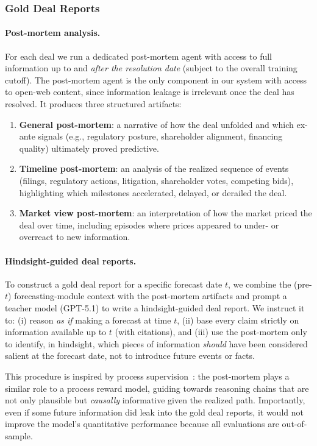 \documentclass{article}
\theoremstyle{plain}
\theoremstyle{definition}
\theoremstyle{remark}
\begin{document}
\subsubsection{Gold Deal Reports}
\label{sec:gold-reasoning}

\paragraph{Post-mortem analysis.}
For each deal we run a dedicated post-mortem agent with access to full information up to and \emph{after the resolution date} (subject to the overall training cutoff). The post-mortem agent is the only component in our system with access to open-web content, since information leakage is irrelevant once the deal has resolved. It produces three structured artifacts:
\begin{enumerate}
    \item \textbf{General post-mortem}: a narrative of how the deal unfolded and which ex-ante signals (e.g., regulatory posture, shareholder alignment, financing quality) ultimately proved predictive.
    \item \textbf{Timeline post-mortem}: an analysis of the realized sequence of events (filings, regulatory actions, litigation, shareholder votes, competing bids), highlighting which milestones accelerated, delayed, or derailed the deal.
    \item \textbf{Market view post-mortem}: an interpretation of how the market priced the deal over time, including episodes where prices appeared to under- or overreact to new information.
\end{enumerate}


\paragraph{Hindsight-guided deal reports.}
To construct a gold deal report for a specific forecast date $t$, we combine the (pre-$t$) forecasting-module context with the post-mortem artifacts and prompt a teacher model (GPT-5.1) to write a hindsight-guided deal report. We instruct it to: (i) reason \emph{as if} making a forecast at time $t$, (ii) base every claim strictly on information available up to $t$ (with citations), and (iii) use the post-mortem only to identify, in hindsight, which pieces of information \emph{should} have been considered salient at the forecast date, not to introduce future events or facts.

This procedure is inspired by process supervision~\cite{uesato2022process,lightman2023prm,luo2024automatedprm}: the post-mortem plays a similar role to a process reward model, guiding towards reasoning chains that are not only plausible but \emph{causally} informative given the realized path. 
Importantly, even if some future information did leak into the gold deal reports, it would not improve the model's quantitative performance because all evaluations are out-of-sample. 
\end{document}
